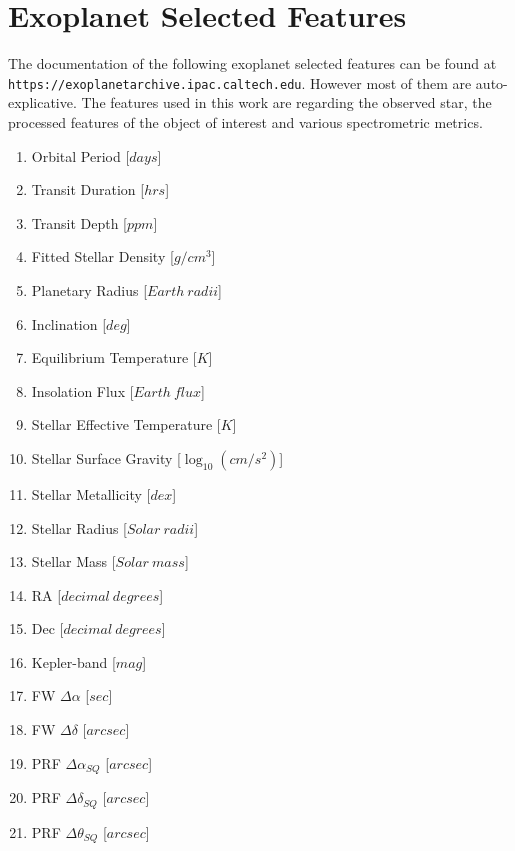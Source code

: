 \documentclass[11pt, a4paper]{article}
\begin{document}
\clearpage
\appendix
\appendixpage

\section{Exoplanet Selected Features}
  The documentation of the following exoplanet selected features can be found at \texttt{https://exoplanetarchive.ipac.caltech.edu}.
  However most of them are auto-explicative.
  The features used in this work are regarding the observed star, the processed features of the object of interest and various spectrometric metrics.
  \begin{multicols}{2}
    \label{appendix:features}
    \begin{enumerate}
      \item Orbital Period [$days$]
      \item Transit Duration [$hrs$]
      \item Transit Depth [$ppm$]
      \item Fitted Stellar Density [$g/cm^{3}$]
      \item Planetary Radius [$Earth\:radii$]
      \item Inclination [$deg$]
      \item Equilibrium Temperature [$K$]
      \item Insolation Flux [$Earth\:flux$]
      \item Stellar Effective Temperature [$K$]
      \item Stellar Surface Gravity [$\log_{10}(cm/s^{2})$]
      \item Stellar Metallicity [$dex$]
      \item Stellar Radius [$Solar\:radii$]
      \item Stellar Mass [$Solar\:mass$]
      \item RA [$decimal\:degrees$]
      \item Dec [$decimal\:degrees$]
      \item Kepler-band [$mag$]
      \item FW $\Delta\alpha$ [$sec$]
      \item FW $\Delta\delta$ [$arcsec$]
      \item PRF $\Delta\alpha_{SQ}$ [$arcsec$]
      \item PRF $\Delta\delta_{SQ}$ [$arcsec$]
      \item PRF $\Delta\theta_{SQ}$ [$arcsec$]
    \end{enumerate}
  \end{multicols}
\end{document}
